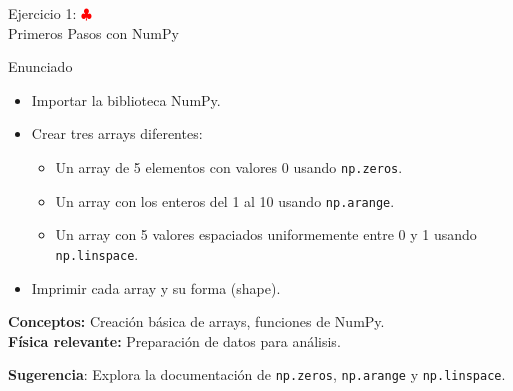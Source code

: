\documentclass[10pt]{beamer}
\begin{document}
\begin{frame}{Ejercicio 1: \hfill \textcolor{red}{$\clubsuit$} \\ Primeros Pasos con NumPy}
  \begin{block}{Enunciado}
    \begin{itemize}
      \item Importar la biblioteca NumPy.
      \item Crear tres arrays diferentes:
        \begin{itemize}
          \item Un array de 5 elementos con valores 0 usando \texttt{np.zeros}.
          \item Un array con los enteros del 1 al 10 usando \texttt{np.arange}.
          \item Un array con 5 valores espaciados uniformemente entre 0 y 1 usando \texttt{np.linspace}.
        \end{itemize}
      \item Imprimir cada array y su forma (shape).
    \end{itemize}
  \end{block}
  
  \textbf{Conceptos:} Creación básica de arrays, funciones de NumPy.\\
  \textbf{Física relevante:} Preparación de datos para análisis.
  
  \textbf{Sugerencia}: Explora la documentación de \texttt{np.zeros}, \texttt{np.arange} y \texttt{np.linspace}.
\end{frame}

\end{document}
